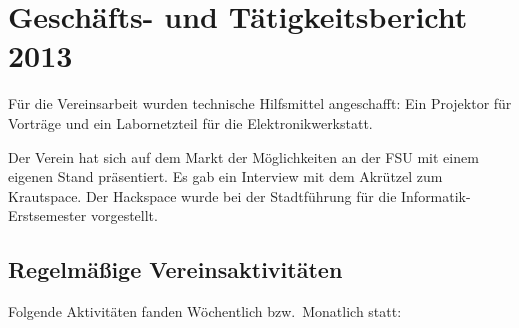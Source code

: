 \documentclass[10pt, a4paper]{scrartcl}
\begin{document}
\section*{Geschäfts- und Tätigkeitsbericht 2013}
Für die Vereinsarbeit wurden technische Hilfsmittel angeschafft: 
Ein Projektor für Vorträge und ein Labornetzteil für die Elektronikwerkstatt. 

Der Verein hat sich auf dem Markt der Möglichkeiten an der FSU mit einem eigenen Stand präsentiert. Es gab ein Interview mit dem Akrützel zum Krautspace. Der Hackspace wurde bei der Stadtführung für die Informatik-Erstsemester vorgestellt. 

\subsection*{Regelmäßige Vereinsaktivitäten}
Folgende Aktivitäten fanden Wöchentlich bzw.\ Monatlich statt:
\end{document}
